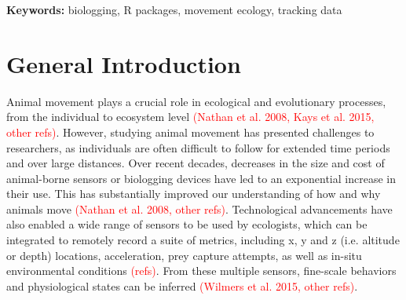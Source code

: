 \documentclass[a4paper,12pt]{article}
\begin{document}
\noindent \textbf{Keywords:} biologging, R packages, movement ecology, tracking data



\newpage


\section*{General Introduction}
%


Animal movement plays a crucial role in ecological and evolutionary processes, from the individual to ecosystem level \textcolor{red}{(Nathan et al. 2008, Kays et al. 2015, other refs)}. However, studying animal movement has presented challenges to researchers, as individuals are often difficult to follow for extended time periods and over large distances. Over recent decades, decreases in the size and cost of animal-borne sensors or biologging devices have led to an exponential increase in their use. This has substantially improved our understanding of how and why animals move \textcolor{red}{(Nathan et al. 2008, other refs)}. Technological advancements have also enabled a wide range of sensors to be used by ecologists, which can be integrated to remotely record a suite of metrics, including x, y and z (i.e. altitude or depth) locations, acceleration, prey capture attempts, as well as in-situ environmental conditions \textcolor{red}{(refs)}. From these multiple sensors, fine-scale behaviors and physiological states can be inferred \textcolor{red}{(Wilmers et al. 2015, other refs)}. 
\end{document}
